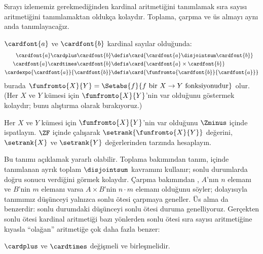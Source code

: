 \documentclass[../../../include/open-logic-section]{subfiles}
\begin{document}

Sırayı izlememiz gerekmediğinden kardinal aritmetiğini tanımlamak sıra
sayısı aritmetiğini tanımlamaktan oldukça kolaydır. Toplama, çarpma ve
üs almayı aynı anda tanımlayacağız.

\begin{defn}
$\cardfont{a}$ ve $\cardfont{b}$ kardinal sayılar olduğunda:
\begin{align*}
	\cardfont{a} \cardplus \cardfont{b} &\defis
	\card{\cardfont{a} \disjointsum \cardfont{b}}\\
	\cardfont{a} \cardtimes \cardfont{b} &\defis
	\card{\cardfont{a} \times \cardfont{b}}\\
	\cardexpo{\cardfont{a}}{\cardfont{b}} &\defis
	\card{\funfromto{\cardfont{b}}{\cardfont{a}}}
\end{align*}
burada $\funfromto{X}{Y} = \Setabs{f}{f \text{ bir } X \to Y
\text{ fonksiyonudur}}$ olur. (Her $X$ ve $Y$ kümesi için
$\funfromto{X}{Y}$'nin var olduğunu göstermek kolaydır; bunu alıştırma
olarak bırakıyoruz.)
\end{defn}

\begin{prob}
Her $X$ ve $Y$ kümesi için $\funfromto{X}{Y}$'nin var olduğunu $\Zminus$
içinde ispatlayın. $\ZF$ içinde çalışarak
$\setrank{\funfromto{X}{Y}}$ değerini, $\setrank{X}$ ve $\setrank{Y}$
değerlerinden
 tarzında
hesaplayın.
\end{prob}

Bu tanımı açıklamak yararlı olabilir. Toplama bakımından tanım,
 içinde tanımlanan ayrık toplam
$\disjointsum$ kavramını kullanır; sonlu durumlarda doğru sonucu verdiğini
görmek kolaydır. Çarpma bakımından
, $A$'nın $n$ elemanı ve $B$'nin $m$
elemanı varsa $A\times B$'nin $n\cdot m$ elemanı olduğunu söyler;
dolayısıyla tanımımız düşünceyi yalnızca sonlu ötesi çarpmaya geneller.
Üs alma da benzerdir: sonlu durumdaki düşünceyi sonlu ötesi duruma
genelliyoruz. Gerçekten sonlu ötesi kardinal aritmetiği bazı yönlerden
sonlu ötesi sıra sayısı aritmetiğine kıyasla ``olağan'' aritmetiğe çok
daha fazla benzer:

\begin{prop}
$\cardplus$ ve $\cardtimes$ değişmeli ve birleşmelidir.
\end{prop}
\end{document}
